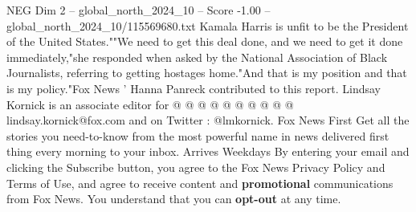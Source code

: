 \begin{textsample}{NEG Dim 2 – global\_north\_2024\_10 – Score -1.00 – global\_north\_2024\_10/115569680.txt}
Kamala Harris is unfit to be the President of the United States.""We need to get this deal done, and we need to get it done immediately,"she responded when asked by the National Association of Black Journalists, referring to getting hostages home."And that is my position and that is my policy."Fox News ' Hanna Panreck contributed to this report.
Lindsay Kornick is an associate editor for @ @ @ @ @ @ @ @ @ @ lindsay.kornick@fox.com and on Twitter : @lmkornick.
Fox News First Get all the stories you need-to-know from the most powerful name in news delivered first thing every morning to your inbox.
Arrives Weekdays By entering your email and clicking the Subscribe button, you agree to the Fox News Privacy Policy and Terms of Use, and agree to receive content and \textbf{promotional} communications from Fox News.
You understand that you can \textbf{opt-out} at any time.

\end{textsample}
